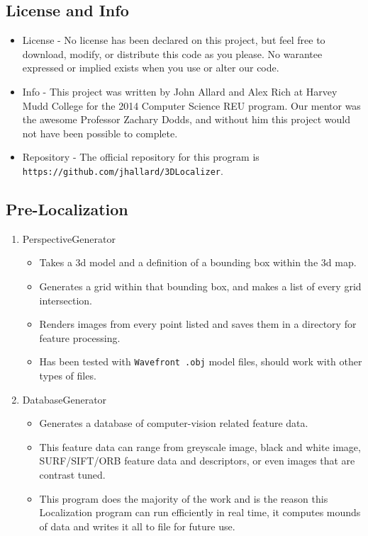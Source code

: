 \documentclass[a4paper,11pt]{article}
\begin{document}
       \subsection{License and Info}
       \begin{itemize}
        \item License - No license has been declared on this project, but feel free to download, modify, or distribute this code as you please.
        No warantee expressed or implied exists when you use or alter our code.
        \item Info    - This project was written by John Allard and Alex Rich at Harvey Mudd College for the 2014 Computer Science REU program.
        Our mentor was the awesome Professor Zachary Dodds, and without him this project would not have been possible to complete.
        \item Repository - The official repository for this program is \texttt{https://github.com/jhallard/3DLocalizer}. 
       \end{itemize}

        \subsection{Pre-Localization}

        \begin{enumerate}
        \item PerspectiveGenerator
            \begin{itemize}
            \item Takes a 3d model and a definition of a bounding box within the 3d map.
            \item Generates a grid within that bounding box, and makes a list of every grid intersection.
            \item Renders images from every point listed and saves them in a directory for feature processing. 
            \item Has been tested with \texttt{Wavefront .obj} model files, should work with other types of files.
            \end{itemize}
        \item DatabaseGenerator
            \begin{itemize}
            \item Generates a database of computer-vision related feature data.
            \item This feature data can range from greyscale image, black and white image, SURF/SIFT/ORB feature data and descriptors, or even images that are
            contrast tuned.
            \item This program does the majority of the work and is the reason this Localization program can run efficiently in real time, it computes mounds of data 
            and writes it all to file for future use.
            \end{itemize}
        \end{enumerate}
  
\end{document}
